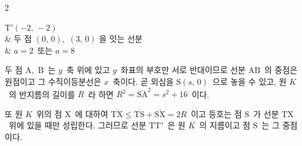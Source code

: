 \documentclass[10pt,fleqn]{article}
\begin{document}
\begin{multicols*}{2}
\begin{dmanslist}
 $\mathrm{T}'(-2,\,-2)$\\
&  두 점 $(0,\,0)$,\ $(3,\,0)$ 을 잇는 선분\\
&  $a=2$\ 또는 $a=8$
\end{dmanslist}

두 점 $\mathrm{A}$,\ $\mathrm{B}$\ 는 $y$\ 축 위에 있고 $y$\ 좌표의 부호만 서로 반대이므로 선분 $\mathrm{AB}$\ 의 중점은 원점이고 그 수직이등분선은 $x$\ 축이다. 곧 외심을 $\mathrm{S}(s,\,0)$\ 으로 놓을 수 있고, 원 $K$\ 의 반지름의 길이를 $R$\ 라 하면 $R^{2}=\overline{\mathrm{SA}}^{2}=s^{2}+16$\ 이다.

또 원 $K$\ 위의 점 $\mathrm{X}$\ 에 대하여 $\overline{\mathrm{TX}}\le\overline{\mathrm{TS}}+\overline{\mathrm{SX}}=2R$\ 이고 등호는 점 $\mathrm{S}$\ 가 선분 $\mathrm{TX}$\ 위에 있을 때만 성립한다. 그러므로 선분 $\mathrm{TT}'$\ 은 원 $K$\ 의 지름이고 점 $\mathrm{S}$\ 는 그 중점이다.


\end{multicols*}
\end{document}
